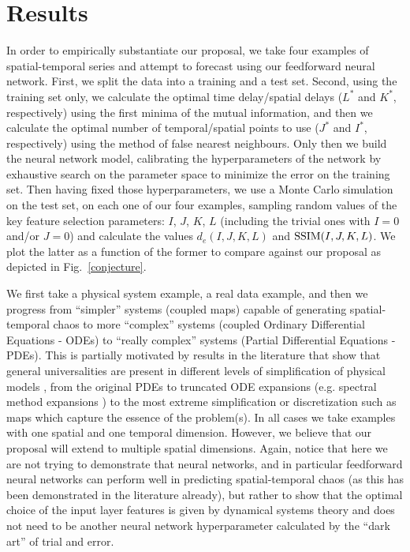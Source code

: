 \documentclass[journal]{IEEEtran}
\begin{document}

\section{Results}
\label{resultssection}

In order to empirically substantiate our proposal, we take four examples of spatial-temporal series and attempt
to forecast using our feedforward neural network. 
First, we split the data into a training and a test set. Second, using the training set only, 
we calculate the optimal time delay/spatial delays ($L^*$ and $K^*$, respectively)
using the first minima of the mutual information, and then we calculate the optimal number of temporal/spatial points to use
($J^*$ and $I^*$, respectively) using the method of false nearest neighbours.
Only then we build the neural network model, calibrating the hyperparameters of the network by exhaustive search on the parameter space
to minimize the error on the training set. Then having fixed those hyperparameters, we 
use a Monte Carlo simulation on the test set, on each one of our four examples, sampling random values
of the key feature selection parameters: $I$, $J$, $K$, $L$ (including the trivial ones with $I=0$ and/or $J=0$) 
and calculate the values $d_e(I,J,K,L)$ 
and $\textnormal{SSIM}(I,J,K,L)$.
We plot the latter as a function of the former to compare against our proposal as depicted in Fig.\ \ref{conjecture}.

We first take a physical system example, a real data example, and then we progress from ``simpler'' systems (coupled maps) 
capable of generating 
spatial-temporal chaos to more ``complex'' systems (coupled Ordinary Differential Equations - ODEs) to ``really complex'' systems (Partial 
Differential Equations - PDEs). This is partially motivated by results in the literature that show that general universalities are 
present in different levels of simplification of physical models \cite{2001Chaos..11..404C}, 
from the original PDEs to truncated ODE expansions (e.g. spectral 
method expansions \cite{2001cfsm.book.....B}) to the most extreme simplification or discretization such as maps 
which capture the essence of the problem(s). In all cases we take examples with one spatial and one temporal dimension. 
However, we believe 
that our proposal will extend to multiple spatial dimensions. Again, notice that here we are not trying to demonstrate
that neural networks, and in particular feedforward neural networks can perform well in predicting spatial-temporal chaos
(as this has been demonstrated in the literature already), but 
rather to show that the optimal choice of the input layer features is given by dynamical systems theory and does not need to be
another neural network hyperparameter calculated by the ``dark art'' of trial and error.
\end{document}
